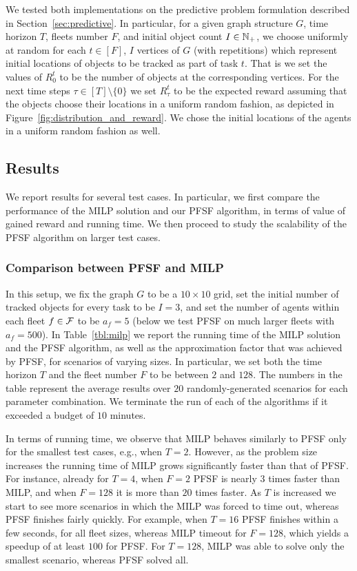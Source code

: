 \documentclass[conference]{IEEEtran}
\begin{document}
We tested both implementations on the predictive problem formulation described in Section~\ref{sec:predictive}. In particular, for a given graph structure $G$, time horizon $T$, fleets number $F$, and initial object count $I\in \mathbb{N}_+$, we choose uniformly at random for each $t\in [F]$, $I$ vertices of $G$ (with repetitions) 
which represent initial locations of objects to be tracked as part of task $t$. That is we set the values of $R^t_0$ to be the number of objects at the corresponding vertices. For the next time steps $\tau\in [T]\setminus \{0\}$ we set $R^t_\tau$ to be the expected reward assuming that the objects choose their locations in a uniform random fashion, as depicted in Figure~\ref{fig:distribution_and_reward}. We chose the initial locations of the agents in a uniform random fashion as well. 

\subsection{Results}
We report results for several test cases. In particular, we first compare the performance of the MILP solution and our PFSF algorithm, in terms of value of gained reward and running time. We then proceed to study the scalability of the PFSF algorithm on larger test cases. 

\subsubsection{Comparison between PFSF and  MILP}
In this setup, we fix the graph $G$ to be a $10\times 10$ grid, set the initial number of tracked objects for every task to be $I=3$, and set the number of agents within each fleet $f\in \mathcal{F}$ to be $a_f=5$ (below we test PFSF on much larger fleets with $a_f=500$). In Table~\ref{tbl:milp} we report the running time of the MILP solution and the PFSF algorithm, as well as the approximation factor that was achieved by PFSF, for scenarios of varying sizes. In particular, we set both the time horizon $T$ and the fleet number $F$ to be between $2$ and $128$. The numbers in the table represent the average results over $20$ randomly-generated scenarios for each parameter combination. We terminate the run of each of the algorithms if it exceeded a budget of $10$ minutes. 

In terms of running time, we observe that MILP behaves similarly to PFSF only for the smallest test cases, e.g., when $T=2$. However, as the problem size increases the running time of MILP grows significantly faster than that of PFSF. For instance, already for $T=4$, when $F=2$ PFSF is nearly $3$ times faster than MILP, and when $F=128$ it is more than $20$ times faster. As $T$ is increased we start to see more scenarios in which the MILP was forced to time out, whereas PFSF finishes fairly quickly. For example, when $T=16$ PFSF finishes within a few seconds, for all fleet sizes, whereas MILP timeout for $F=128$, which yields a speedup of at least $100$ for PFSF. For $T=128$, MILP was able to solve only the smallest scenario, whereas PFSF solved all.
\end{document}
